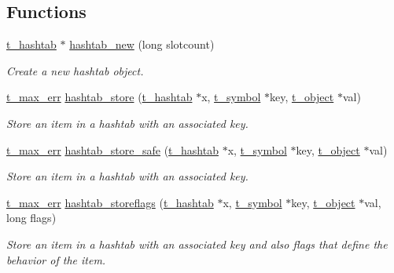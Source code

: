 \subsection*{Functions}
\begin{DoxyCompactItemize}
\item 
\hyperlink{structt__hashtab}{t\_\-hashtab} $\ast$ \hyperlink{group__hashtab_ga70be9bbfb9bd9383824df0832477267f}{hashtab\_\-new} (long slotcount)
\begin{DoxyCompactList}\small\item\em Create a new hashtab object. \item\end{DoxyCompactList}\item 
\hyperlink{group__datatypes_ga73edaae82b318855cc09fac994918165}{t\_\-max\_\-err} \hyperlink{group__hashtab_gaa26ebe9ba21e84dd0dbb8d5aed12e5a1}{hashtab\_\-store} (\hyperlink{structt__hashtab}{t\_\-hashtab} $\ast$x, \hyperlink{structt__symbol}{t\_\-symbol} $\ast$key, \hyperlink{structt__object}{t\_\-object} $\ast$val)
\begin{DoxyCompactList}\small\item\em Store an item in a hashtab with an associated key. \item\end{DoxyCompactList}\item 
\hyperlink{group__datatypes_ga73edaae82b318855cc09fac994918165}{t\_\-max\_\-err} \hyperlink{group__hashtab_ga31d25e5b56c439be3f31bf17efa36349}{hashtab\_\-store\_\-safe} (\hyperlink{structt__hashtab}{t\_\-hashtab} $\ast$x, \hyperlink{structt__symbol}{t\_\-symbol} $\ast$key, \hyperlink{structt__object}{t\_\-object} $\ast$val)
\begin{DoxyCompactList}\small\item\em Store an item in a hashtab with an associated key. \item\end{DoxyCompactList}\item 
\hyperlink{group__datatypes_ga73edaae82b318855cc09fac994918165}{t\_\-max\_\-err} \hyperlink{group__hashtab_gab09bf88c81aeb3d71b6661f20989603d}{hashtab\_\-storeflags} (\hyperlink{structt__hashtab}{t\_\-hashtab} $\ast$x, \hyperlink{structt__symbol}{t\_\-symbol} $\ast$key, \hyperlink{structt__object}{t\_\-object} $\ast$val, long flags)
\begin{DoxyCompactList}\small\item\em Store an item in a hashtab with an associated key and also flags that define the behavior of the item. \item\end{DoxyCompactList}\item 

\end{DoxyCompactItemize}
